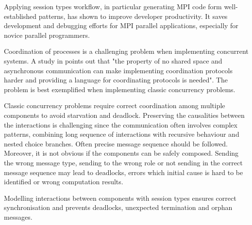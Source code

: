 Applying session types  workflow, in particular generating MPI code form well-established patterns, has shown to improve developer productivity. It saves development and debugging efforts for MPI parallel applications, especially for novice parallel programmers.  


Coordination of processes is a challenging problem when implementing concurrent systems. 
A study in \cite{ActorCoordinationStudy} points out that "the property of no shared space and asynchronous
communication can make implementing coordination protocols harder and providing a language
for coordinating protocols is needed". The problem is best exemplified when implementing classic concurrency problems. 

Classic concurrency problems require correct coordination among multiple components to avoid starvation and deadlock. Preserving the causalities between the interactions is challenging since the communication often involves complex patterns, combining long sequence of interactions with recursive behaviour and nested choice branches.
Often precise message sequence should be followed. Moreover, it is not obvious if the components can be safely composed. Sending the wrong message type, sending to the wrong role or not sending in the correct message sequence may lead to deadlocks, errors which initial cause is hard to be identified or wrong computation results.


Modelling interactions between components with session types ensures correct synchronisation and prevents deadlocks, unexpected termination and orphan messages. 

